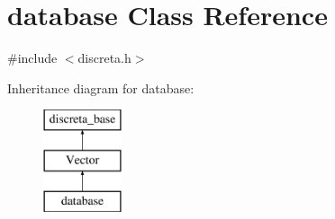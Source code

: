 \hypertarget{classdatabase}{}\section{database Class Reference}
\label{classdatabase}


{\ttfamily \#include $<$discreta.\+h$>$}

Inheritance diagram for database\+:\begin{figure}[H]
\begin{center}
\leavevmode
\includegraphics[height=3.000000cm]{classdatabase}
\end{center}
\end{figure}
